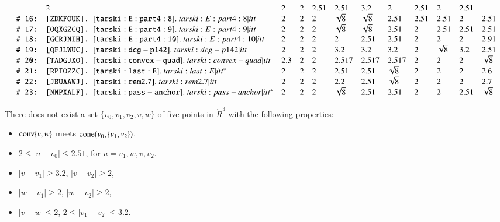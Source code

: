 \begin{lemma}
$$\begin{array}{llllllllllll}
   &2 &2 &2 &2.51& 2.51 &3.2& 2 & 2.51 & 2 & 2.51\\
%
 \rr{16}&\tuid{ZDKFOUK}\tlabel{tarski:E:part4:8}
   &2 &2 &2 &\sqrt{8}& \sqrt{8} &2.51& 2.51 & 2.51 & 2 &  2.51\\
%
 \rr{17}&\tuid{OQXGZCQ}\tlabel{tarski:E:part4:9}
   &2 &2 &2 &\sqrt{8}& \sqrt{8} &2.51& 2 & 2.51 & 2.51 &  2.51\\
%
 \rr{18}&\tuid{GCRJNIH}\tlabel{tarski:E:part4:10}
   &2 &2 &2 &  2& 2.51 &2.51&   2 & 2 & 2 &  2.91\\
%
 \rr{19}&\tuid{QFJLWUC}\tlabel{tarski:dcg-p142}
   &2 &2 &2 &   3.2& 3.2 &3.2&   2 & \sqrt8 & 3.2 &  2.51\\
%
 \rr{20}&\tuid{TADGJXO}\tlabel{tarski:convex-quad}
   &2.3 &2 &2 &   2.517& 2.517 &2.517&  2 & 2 & 2 &  \sqrt8\\
 \rr{21}&\tuid{RPIOZZC}\tlabel{tarski:last:E}\usage{DCG-[11.22]{ remark:2.6}}
   &2 &2 &2 &  2.51& 2.51 &\sqrt8&  2 & 2 & 2 & 2.6\\
%
 \rr{22}&\tuid{JBUAAWJ} \tlabel{tarski:rem2.7}
     &2 &2 &2 &2.2& 2.51 &\sqrt{8}& 2 & 2 & 2 & 2.7\\
%
 \rr{23}&\tuid{NNPXALF} \tlabel{tarski:pass-anchor}\usage{DCG-[4.24]{ lemma:pass-anchor}}
     &2&2&2&\sqrt8 &2.51 &2.51 &2 &2 &2.51&\sqrt8\\
\end{array}$$
\end{lemma}
 


\newpage



\begin{lemma}
  There does not exist a set $\{v_0,v_1,v_2,v,w\}$ of five points
in $\ring{R}^3$ with the following properties:
\begin{itemize}
  \item ${\operatorname{conv}}\{v,w\}$ meets ${\operatorname{cone}}(v_0,\{v_1,v_2\})$.
  \item $2\le |u-v_0| \le 2.51$, for $u=v_1,w,v,v_2$.
    \item $|v-v_1|\ge 3.2$,  $|v-v_2|\ge 2$,
    \item $|w-v_1|\ge2$, $|w-v_2|\ge2$,
    \item   $|v-w|\le2$, $2\le |v_1-v_2|\le 3.2$.
\end{itemize}
\end{lemma}

